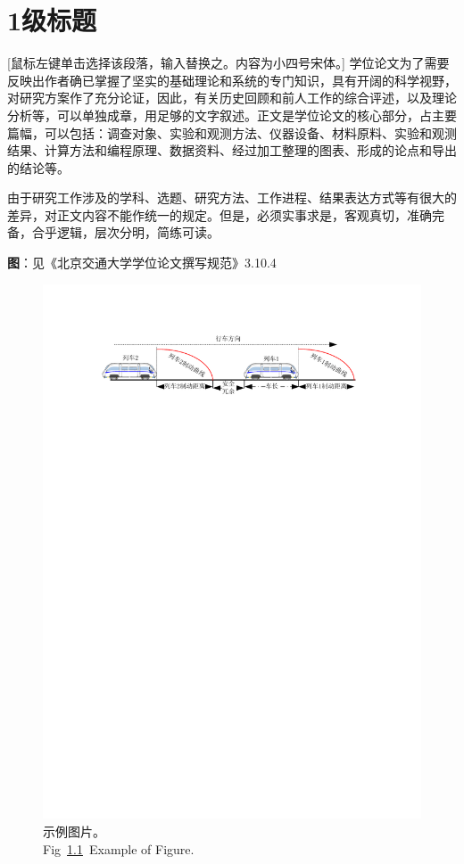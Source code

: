  \setlength{\baselineskip}{20pt}
\chapter{1级标题}
\label{cha:chap2}

[鼠标左键单击选择该段落，输入替换之。内容为小四号宋体。] 学位论文为了需要反映出作者确已掌握了坚实的基础理论和系统的专门知识，具有开阔的科学视野，对研究方案作了充分论证，因此，有关历史回顾和前人工作的综合评述，以及理论分析等，可以单独成章，用足够的文字叙述。正文是学位论文的核心部分，占主要篇幅，可以包括：调查对象、实验和观测方法、仪器设备、材料原料、实验和观测结果、计算方法和编程原理、数据资料、经过加工整理的图表、形成的论点和导出的结论等。


由于研究工作涉及的学科、选题、研究方法、工作进程、结果表达方式等有很大的差异，对正文内容不能作统一的规定。但是，必须实事求是，客观真切，准确完备，合乎逻辑，层次分明，简练可读。


\textbf{图}：见《北京交通大学学位论文撰写规范》3.10.4
\begin{figure}[!htb] %
	\setlength{\belowcaptionskip}{-0.2cm} 
	\centering
	\includegraphics[scale=1]{figures/figure1.pdf}
	\caption{示例图片。\\Fig~\ref{fig:02:01}~Example of Figure.}
	\label{fig:02:01}
\end{figure}

